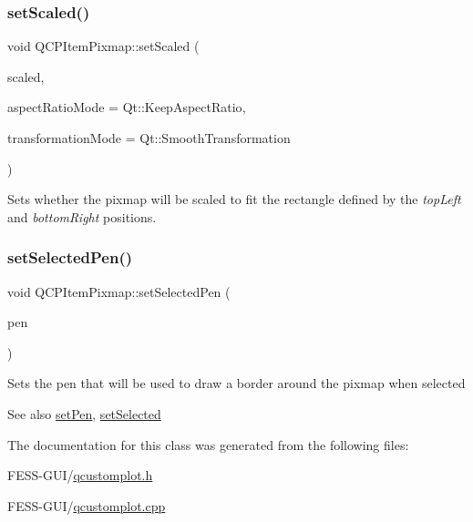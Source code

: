 \subsubsection{\texorpdfstring{set\+Scaled()}{setScaled()}}
{\footnotesize\ttfamily void Q\+C\+P\+Item\+Pixmap\+::set\+Scaled (\begin{DoxyParamCaption}\item[{bool}]{scaled,  }\item[{Qt\+::\+Aspect\+Ratio\+Mode}]{aspect\+Ratio\+Mode = {\ttfamily Qt\+:\+:KeepAspectRatio},  }\item[{Qt\+::\+Transformation\+Mode}]{transformation\+Mode = {\ttfamily Qt\+:\+:SmoothTransformation} }\end{DoxyParamCaption})}

Sets whether the pixmap will be scaled to fit the rectangle defined by the {\itshape top\+Left} and {\itshape bottom\+Right} positions. \hypertarget{class_q_c_p_item_pixmap_afc5e479e88e53740176ce77cb70dd67a}{}\label{class_q_c_p_item_pixmap_afc5e479e88e53740176ce77cb70dd67a} 
\subsubsection{\texorpdfstring{set\+Selected\+Pen()}{setSelectedPen()}}
{\footnotesize\ttfamily void Q\+C\+P\+Item\+Pixmap\+::set\+Selected\+Pen (\begin{DoxyParamCaption}\item[{const Q\+Pen \&}]{pen }\end{DoxyParamCaption})}

Sets the pen that will be used to draw a border around the pixmap when selected

\begin{DoxySeeAlso}{See also}
\hyperlink{class_q_c_p_item_pixmap_acdade1305edb4b5cae14f97fd132065f}{set\+Pen}, \hyperlink{class_q_c_p_abstract_item_a203de94ad586cc44d16c9565f49d3378}{set\+Selected} 
\end{DoxySeeAlso}


The documentation for this class was generated from the following files\+:\begin{DoxyCompactItemize}
\item 
F\+E\+S\+S-\/\+G\+U\+I/\hyperlink{qcustomplot_8h}{qcustomplot.\+h}\item 
F\+E\+S\+S-\/\+G\+U\+I/\hyperlink{qcustomplot_8cpp}{qcustomplot.\+cpp}\end{DoxyCompactItemize}
